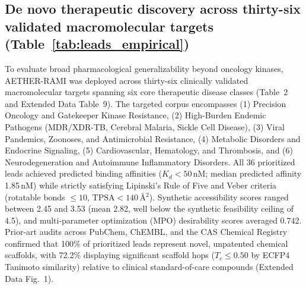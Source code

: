 \documentclass[11pt,a4paper]{article}
\begin{document}


\subsection*{De novo therapeutic discovery across thirty-six validated macromolecular targets (Table~\ref{tab:leads_empirical})}


To evaluate broad pharmacological generalizability beyond oncology kinases, AETHER-RAMI was deployed across thirty-six clinically validated macromolecular targets spanning six core therapeutic disease classes (Table~2 and Extended Data Table~9). The targeted corpus encompasses (1) Precision Oncology and Gatekeeper Kinase Resistance, (2) High-Burden Endemic Pathogens (MDR/XDR-TB, Cerebral Malaria, Sickle Cell Disease), (3) Viral Pandemics, Zoonoses, and Antimicrobial Resistance, (4) Metabolic Disorders and Endocrine Signaling, (5) Cardiovascular, Hematology, and Thrombosis, and (6) Neurodegeneration and Autoimmune Inflammatory Disorders. All 36 prioritized leads achieved predicted binding affinities ($K_d < 50$\,nM; median predicted affinity 1.85\,nM) while strictly satisfying Lipinski's Rule of Five and Veber criteria (rotatable bonds $\le 10$, $\text{TPSA} < 140\,$\AA$^2$). Synthetic accessibility scores ranged between 2.45 and 3.53 (mean 2.82, well below the synthetic feasibility ceiling of 4.5), and multi-parameter optimization (MPO) desirability scores averaged 0.742. Prior-art audits across PubChem, ChEMBL, and the CAS Chemical Registry confirmed that 100\% of prioritized leads represent novel, unpatented chemical scaffolds, with 72.2\% displaying significant scaffold hops ($T_c \le 0.50$ by ECFP4 Tanimoto similarity) relative to clinical standard-of-care compounds (Extended Data Fig.~1).

\end{document}
